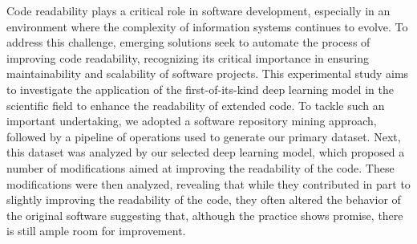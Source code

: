 Code readability plays a critical role in software development, especially in an environment where the complexity of information systems continues to evolve. To address this challenge, emerging solutions seek to automate the process of improving code readability, recognizing its critical importance in ensuring maintainability and scalability of software projects. This experimental study aims to investigate the application of the first-of-its-kind deep learning model in the scientific field to enhance the readability of extended code. To tackle such an important undertaking, we adopted a software repository mining approach, followed by a pipeline of operations used to generate our primary dataset. Next, this dataset was analyzed by our selected deep learning model, which proposed a number of modifications aimed at improving the readability of the code. These modifications were then analyzed, revealing that while they contributed in part to slightly improving the readability of the code, they often altered the behavior of the original software suggesting that, although the practice shows promise, there is still ample room for improvement.
